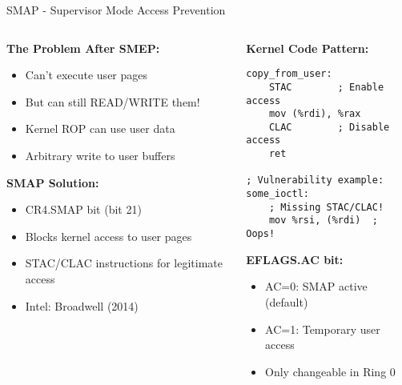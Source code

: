 \documentclass[aspectratio=169,12pt]{beamer}
\begin{document}
\begin{frame}[fragile]{SMAP - Supervisor Mode Access Prevention}
    \begin{columns}
        \begin{column}{0.5\textwidth}
            \textbf{The Problem After SMEP:}
            \begin{itemize}
                \item Can't execute user pages
                \item But can still READ/WRITE them!
                \item Kernel ROP can use user data
                \item Arbitrary write to user buffers
            \end{itemize}
            
            \vspace{0.3cm}
            \textbf{SMAP Solution:}
            \begin{itemize}
                \item CR4.SMAP bit (bit 21)
                \item Blocks kernel access to user pages
                \item STAC/CLAC instructions for legitimate access
                \item Intel: Broadwell (2014)
            \end{itemize}
        \end{column}
        \begin{column}{0.5\textwidth}
            \begin{tcolorbox}[colback=gray!10]
                \small
                \textbf{Kernel Code Pattern:}
                \begin{verbatim}
copy_from_user:
    STAC        ; Enable access
    mov (%rdi), %rax
    CLAC        ; Disable access
    ret
    
; Vulnerability example:
some_ioctl:
    ; Missing STAC/CLAC!
    mov %rsi, (%rdi)  ; Oops!
                \end{verbatim}
            \end{tcolorbox}
            
            \textbf{EFLAGS.AC bit:}
            \begin{itemize}
                \item AC=0: SMAP active (default)
                \item AC=1: Temporary user access
                \item Only changeable in Ring 0
            \end{itemize}
        \end{column}
    \end{columns}
\end{frame}
\end{document}
